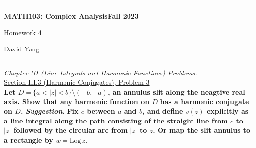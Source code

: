 \documentclass[11pt]{article}
\theoremstyle{definition}
\begin{document}
	\hrule
	\begin{center}
        \textbf{MATH103: Complex Analysis}\hfill \textbf{Fall 2023}\newline

		{\Large Homework 4}

		David Yang
	\end{center}

\hrule

\vspace{1em}


\textit{Chapter III (Line Integrals and Harmonic Functions) Problems.} \\

\underline{Section III.3 (Harmonic Conjugates), Problem 3} \\

\textbf{Let $D = \{a < |z| < b\} \setminus (-b, -a)$, an annulus slit along the neagtive real axis. Show that any harmonic function on $D$ has a harmonic conjugate on $D$. \textit{Suggestion}. Fix $c$ between $a$ and $b$, and define $v(z)$ explicitly as a 
line integral along the path consisting of the straight line from $c$ to $|z|$ followed by the circular arc from $|z|$ to $z$. Or map the slit annulus to a rectangle by $w = \mathrm{Log} \, z.$}
\end{document}
